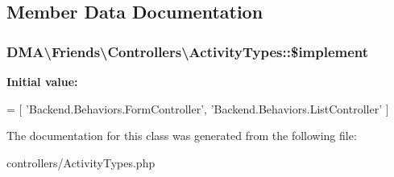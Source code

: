 \subsection{Member Data Documentation}
\hypertarget{classDMA_1_1Friends_1_1Controllers_1_1ActivityTypes_a8056141ce368e3e68051b75f6d785730}{
\subsubsection[{\$implement}]{\setlength{\rightskip}{0pt plus 5cm}D\-M\-A\textbackslash{}\-Friends\textbackslash{}\-Controllers\textbackslash{}\-Activity\-Types\-::\$implement}}\label{classDMA_1_1Friends_1_1Controllers_1_1ActivityTypes_a8056141ce368e3e68051b75f6d785730}
{\bfseries Initial value\-:}
\begin{DoxyCode}
= [
        \textcolor{stringliteral}{'Backend.Behaviors.FormController'},
        \textcolor{stringliteral}{'Backend.Behaviors.ListController'}
    ]
\end{DoxyCode}


The documentation for this class was generated from the following file\-:\begin{DoxyCompactItemize}
\item 
controllers/Activity\-Types.\-php\end{DoxyCompactItemize}

